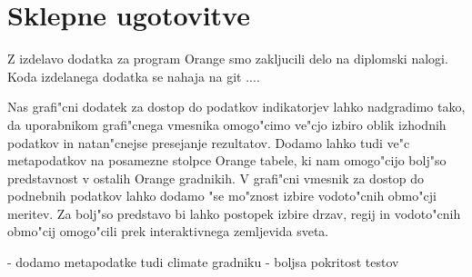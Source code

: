 \chapter{Sklepne ugotovitve}



Z izdelavo dodatka za program Orange smo zakljucili delo na diplomski nalogi.
Koda izdelanega dodatka se nahaja na git ....


% 
%
%
%
%


Nas grafi"cni dodatek za dostop do podatkov indikatorjev lahko nadgradimo tako,
da uporabnikom grafi"cnega vmesnika omogo"cimo ve"cjo izbiro oblik izhodnih
podatkov in natan"cnejse presejanje rezultatov. Dodamo lahko tudi ve"c
metapodatkov na posamezne stolpce Orange tabele, ki nam omogo"cijo bolj"so
predstavnost v ostalih Orange gradnikih. V grafi"cni vmesnik za dostop do
podnebnih podatkov lahko dodamo "se mo"znost izbire vodoto"cnih obmo"cji meritev.
Za bolj"so predstavo bi lahko postopek izbire drzav, regij in vodoto"cnih
obmo"cij omogo"cili prek interaktivnega zemljevida sveta.


- dodamo metapodatke tudi climate gradniku
- boljsa pokritost testov
